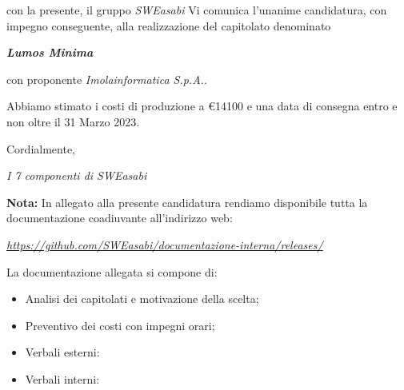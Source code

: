 \documentclass{article}
\begin{document}
con la presente, il gruppo \textit{SWEasabi} Vi comunica l'unanime candidatura, con impegno conseguente, alla realizzazione del capitolato denominato

\begin{center}
    \textbf{\textit{Lumos Minima}}
\end{center}

con proponente \textit{Imolainformatica S.p.A.}.

Abbiamo stimato i costi di produzione a €14100 e una data di consegna entro e non oltre il 31 Marzo 2023.

Cordialmente,

\begin{flushright}
\textit{I 7 componenti di SWEasabi}
\end{flushright}

\textbf{Nota:} In allegato alla presente candidatura rendiamo disponibile tutta la documentazione coadiuvante all'indirizzo web:

\begin{center}
    \href{https://github.com/SWEasabi/documentazione-interna/releases/tag/}{\textit{https://github.com/SWEasabi/documentazione-interna/releases/}}
\end{center}

La documentazione allegata si compone di:
\begin{itemize}
    \item Analisi dei capitolati e motivazione della scelta;
    \item Preventivo dei costi con impegni orari;
    \item Verbali esterni:
    \item Verbali interni:
\end{itemize}
\end{document}
